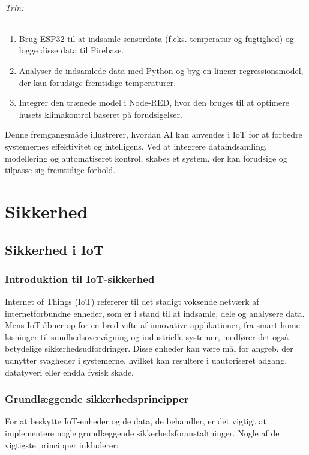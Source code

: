 \documentclass[12pt,a4paper]{book}
\begin{document}
	\paragraph{Trin:}
	\begin{enumerate}
		\item Brug ESP32 til at indsamle sensordata (f.eks. temperatur og fugtighed) og logge disse data til Firebase.
		\item Analyser de indsamlede data med Python og byg en lineær regressionsmodel, der kan forudsige fremtidige temperaturer.
		\item Integrer den trænede model i Node-RED, hvor den bruges til at optimere husets klimakontrol baseret på forudsigelser.
	\end{enumerate}
	Denne fremgangsmåde illustrerer, hvordan AI kan anvendes i IoT for at forbedre systemernes effektivitet og intelligens. Ved at integrere dataindsamling, modellering og automatiseret kontrol, skabes et system, der kan forudsige og tilpasse sig fremtidige forhold.	
	
	\part{Sikkerhed}
	\chapter{Sikkerhed i IoT}
	\section*{Introduktion til IoT-sikkerhed}
	Internet of Things (IoT) refererer til det stadigt voksende netværk af internetforbundne enheder, som er i stand til at indsamle, dele og analysere data. Mens IoT åbner op for en bred vifte af innovative applikationer, fra smart home-løsninger til sundhedsovervågning og industrielle systemer, medfører det også betydelige sikkerhedsudfordringer. Disse enheder kan være mål for angreb, der udnytter svagheder i systemerne, hvilket kan resultere i uautoriseret adgang, datatyveri eller endda fysisk skade.
	
	\section*{Grundlæggende sikkerhedsprincipper}
	For at beskytte IoT-enheder og de data, de behandler, er det vigtigt at implementere nogle grundlæggende sikkerhedsforanstaltninger. Nogle af de vigtigste principper inkluderer:
	
\end{document}
